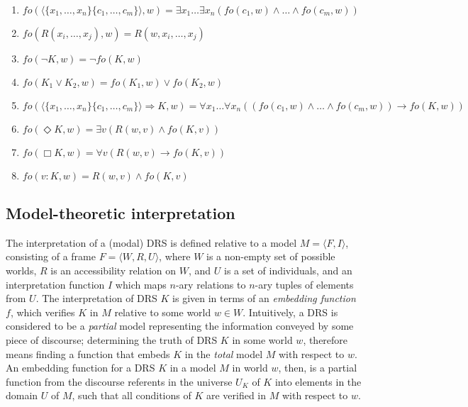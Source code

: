 \begin{definition}~
  \begin{enumerate}
    \item $fo(\langle\{x_1,\ldots,x_n\}\{c_1,\ldots,c_m\}\rangle,w) 
      = \exists x_1\ldots\exists x_n(fo(c_1,w)\wedge\ldots\wedge fo(c_m,w))$
    \item $fo(R(x_i,\ldots,x_j),w) = R(w,x_i,\ldots,x_j)$
    \item $fo(\neg K,w) = \neg fo(K,w)$
    \item $fo(K_1 \vee K_2,w) = fo(K_1,w) \vee fo(K_2,w)$
    \item $fo(\langle\{x_1,\ldots,x_n\}\{c_1,\ldots,c_m\}\rangle \Rightarrow K,w)
      = \forall x_1 \ldots \forall x_n((fo(c_1,w) \wedge \ldots \wedge fo(c_m,w)) 
          \rightarrow fo(K,w))$
    \item $fo(\Diamond K,w) = \exists v (R(w,v) \wedge fo(K,v))$
    \item $fo(\Box K,w) = \forall v (R(w,v) \rightarrow fo(K,v))$
    \item $fo(v:K,w) = R(w,v) \wedge fo(K,v)$
  \end{enumerate}
\end{definition}


\subsection{Model-theoretic interpretation}

The interpretation of a (modal) DRS is defined relative to a model $M=\langle F,
I\rangle$, consisting of a frame $F=\langle W,R,U\rangle$, where $W$ is
a non-empty set of possible worlds, $R$ is an accessibility relation on $W$,
and $U$ is a set of individuals, and an interpretation function $I$ which
maps $n$-ary relations to $n$-ary tuples of elements from $U$.  The
interpretation of DRS $K$ is given in terms of an \textit{embedding
function} $f$, which verifies $K$ in $M$ relative to some world $w\in W$.
Intuitively, a DRS is considered to be a \textit{partial} model representing
the information conveyed by some piece of discourse; determining the truth
of DRS $K$ in some world $w$, therefore means finding a function that embeds
$K$ in the \textit{total} model $M$ with respect to $w$.  An embedding
function for a DRS $K$ in a model $M$ in world $w$, then, is a partial
function from the discourse referents in the universe $U_K$ of $K$ into
elements in the domain $U$ of $M$, such that all conditions of $K$ are
verified in $M$ with respect to $w$. 

